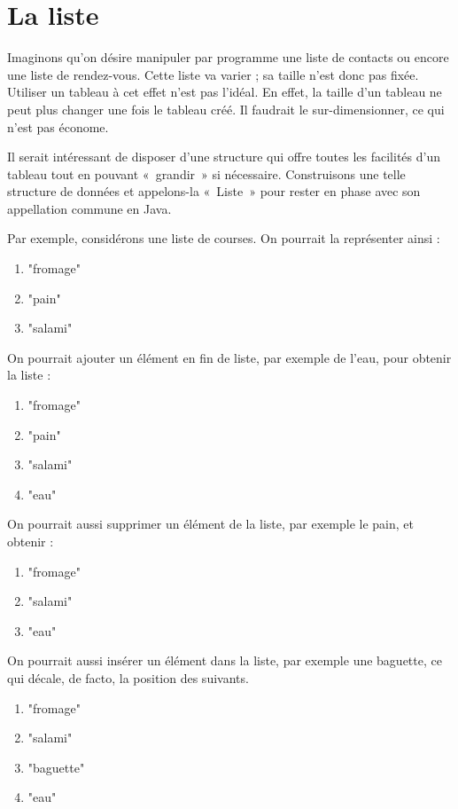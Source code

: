 \chapter{La liste}


Imaginons qu’on désire manipuler par programme une liste de contacts ou
encore une liste de rendez-vous. Cette liste va varier ; sa taille
n’est donc pas fixée. Utiliser un tableau à cet effet n’est pas l’idéal. 
En effet, la taille d’un tableau ne peut plus changer une fois le tableau créé. 
Il faudrait le sur-dimensionner, ce qui n’est pas économe.

Il serait intéressant de disposer d’une structure qui offre toutes les
facilités d’un tableau tout en pouvant «~grandir~» si nécessaire.
Construisons une telle structure de données et appelons-la «~Liste~»
pour rester en phase avec son appellation commune en Java.

Par exemple, considérons une liste de courses.
On pourrait la représenter ainsi :
\begin{enumerate}
\item "fromage"
\item "pain"
\item "salami"
\end{enumerate}

On pourrait ajouter un élément en fin de liste, par exemple de l'eau,
pour obtenir la liste :

\begin{enumerate}
\item "fromage"
\item "pain"
\item "salami"
\item "eau"
\end{enumerate}

On pourrait aussi supprimer un élément de la liste, par exemple le pain,
et obtenir :

\begin{enumerate}
\item "fromage"
\item "salami"
\item "eau"
\end{enumerate}

On pourrait aussi insérer un élément dans la liste, 
par exemple une baguette, 
ce qui décale, de facto, la position des suivants.

\begin{enumerate}
\item "fromage"
\item "salami"
\item "baguette"
\item "eau"
\end{enumerate}

